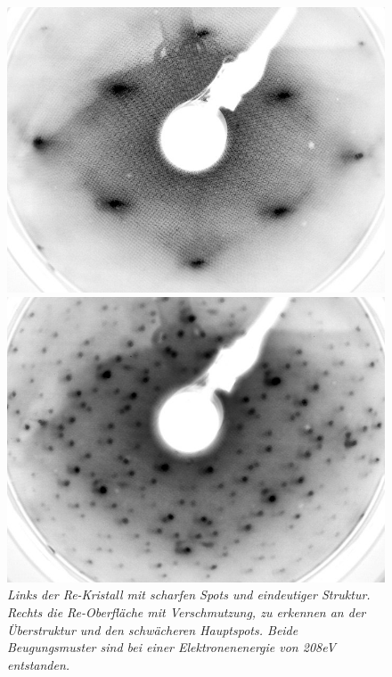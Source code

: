 \begin{figure}[htbp]
	\begin{minipage}[b]{0.5\textwidth} 
		\includegraphics[width=\textwidth]{LEED-Bilder/bearbeitet/unbedampft_E207}
	\end{minipage}
	\hfill
	\begin{minipage}[b]{0.5\textwidth}
		\includegraphics[width=\textwidth]{LEED-Bilder/bearbeitet/unbedampft_E207_MitteKristall.jpg}
	\end{minipage}
	\caption{\textit{Links der Re-Kristall mit scharfen Spots und eindeutiger Struktur. Rechts die
	Re-Oberfläche mit Verschmutzung, zu erkennen an der Überstruktur und den schwächeren Hauptspots.
	Beide Beugungsmuster sind bei einer Elektronenenergie von 208eV entstanden.}}
	\label{rekristall} 
\end{figure}
 

